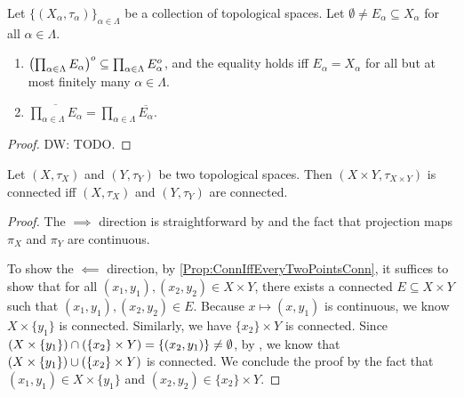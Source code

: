 \documentclass[screen]{techreport}
\numberwithin{equation}{section}
\newcommand{\diw}[1]{{\color{Red} DW: #1}}
\begin{document}
\begin{proposition}\label{Prop:IntProdSubProdIntAndCloProdEqProdClo}
	Let $\{(X_\alpha,\tau_\alpha)\}_{\alpha \in \Lambda}$ be a collection of topological spaces.
	Let $\emptyset \neq E_\alpha \subseteq X_\alpha$ for all $\alpha \in \Lambda$.
	\begin{enumerate}
		\item $\left({\prod_{\alpha \in \Lambda} E_\alpha}\right)^o \subseteq \prod_{\alpha \in \Lambda} E_\alpha^o$, and the equality holds iff $E_\alpha = X_\alpha$ for all but at most finitely many $\alpha \in \Lambda$.
		\item $\overline{\prod_{\alpha \in \Lambda} E_\alpha} = \prod_{\alpha \in \Lambda} \overline{E_\alpha}$.
	\end{enumerate}
\end{proposition}
\begin{proof}
	\diw{TODO.}
\end{proof}

\begin{proposition}\label{Prop:ProdConnIffBothConn}
	Let $(X,\tau_X)$ and $(Y,\tau_Y)$ be two topological spaces.
	Then $(X\times Y,\tau_{X \times Y})$ is connected iff $(X,\tau_X)$ and $(Y,\tau_Y)$ are connected.
\end{proposition}
\begin{proof}
	The $\implies$ direction is straightforward by  and the fact that projection maps $\pi_X$ and $\pi_Y$ are continuous.
	
	To show the $\impliedby$ direction, by \ref{Prop:ConnIffEveryTwoPointsConn}, it suffices to show that for all $(x_1,y_1),(x_2,y_2) \in X \times Y$, there exists a connected $E \subseteq X \times Y$ such that $(x_1,y_1),(x_2,y_2) \in E$.
	Because $x \mapsto (x,y_1)$ is continuous, we know $X \times \{y_1\}$ is connected.
	Similarly, we have $\{x_2\} \times Y$ is connected.
	Since $(X \times \left\{ {y_1} \right\}) \cap (\left\{ {x_2} \right\} \times Y) = \{ (x_2,y_1) \} \neq \emptyset$, by , we know that $(X \times \left\{ {y_1} \right\}) \cup (\left\{ {x_2} \right\} \times Y)$ is connected.
	We conclude the proof by the fact that $(x_1,y_1) \in X \times \{y_1\}$ and $(x_2,y_2) \in \{x_2\} \times Y$.
\end{proof}
\end{document}
